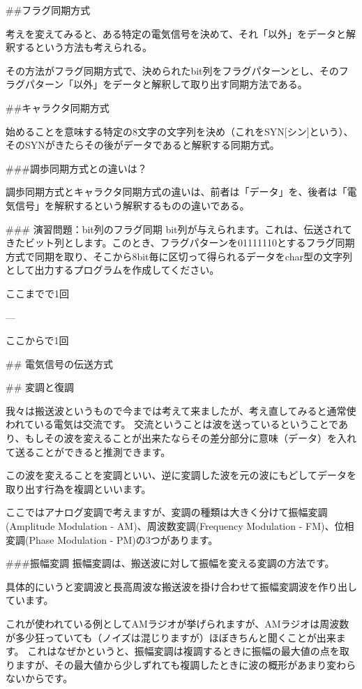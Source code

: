 ##フラグ同期方式

考えを変えてみると、ある特定の電気信号を決めて、それ「以外」をデータと解釈するという方法も考えられる。

その方法がフラグ同期方式で、決められたbit列をフラグパターンとし、そのフラグパターン「以外」をデータと解釈して取り出す同期方法である。

##キャラクタ同期方式

始めることを意味する特定の8文字の文字列を決め（これをSYN[シン]という）、そのSYNがきたらその後がデータであると解釈する同期方式。

###調歩同期方式との違いは？

調歩同期方式とキャラクタ同期方式の違いは、前者は「データ」を、後者は「電気信号」を解釈するという解釈するものの違いである。

### 演習問題：bit列のフラグ同期
bit列が与えられます。これは、伝送されてきたビット列とします。このとき、フラグパターンを01111110とするフラグ同期方式で同期を取り、そこから8bit毎に区切って得られるデータをchar型の文字列として出力するプログラムを作成してください。

ここまでで1回

---

ここからで1回

## 電気信号の伝送方式

## 変調と復調

我々は搬送波というもので今までは考えて来ましたが、考え直してみると通常使われている電気は交流です。
交流ということは波を送っているということであり、もしその波を変えることが出来たならその差分部分に意味（データ）を入れて送ることができると推測できます。

この波を変えることを変調といい、逆に変調した波を元の波にもどしてデータを取り出す行為を複調といいます。

ここではアナログ変調で考えますが、変調の種類は大きく分けて振幅変調(Amplitude Modulation - AM)、周波数変調(Frequency Modulation - FM)、位相変調(Phase Modulation - PM)の3つがあります。

###振幅変調
振幅変調は、搬送波に対して振幅を変える変調の方法です。

具体的にいうと変調波と長高周波な搬送波を掛け合わせて振幅変調波を作り出しています。

これが使われている例としてAMラジオが挙げられますが、AMラジオは周波数が多少狂っていても（ノイズは混じりますが）ほぼきちんと聞くことが出来ます。
これはなぜかというと、振幅変調は複調するときに振幅の最大値の点を取りますが、その最大値から少しずれても複調したときに波の概形があまり変わらないからです。

